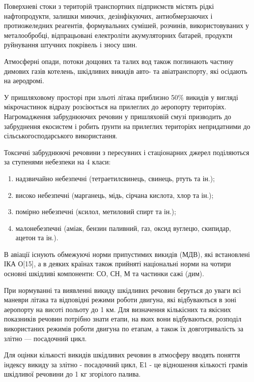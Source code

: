 Поверхневі стоки з територій транспортних підприємств містять рідкі нафтопродукти, залишки миючих, 
дезінфікуючих, антиобмерзаючих і протиожеледних реагентів, формувальних сумішей, розчинів, 
використовуваних у металообробці, відпрацьовані електроліти акумуляторних батарей, продукти 
руйнування штучних покрівель і зносу шин. 

Атмосферні опади, потоки дощових та талих вод також поглинають частину димових газів котелень, 
шкідливих викидів авто- та авіатранспорту, які осідають на аеродромі. 

У пришляховому просторі при зльоті літака приблизно 50\% викидів у вигляді мікрочастинок відразу 
розсіюється на прилеглих до аеропорту територіях. Нагромадження забруднюючих речовин у пришляховій 
смузі призводить до забруднення екосистем і робить ґрунти на прилеглих територіях непридатними до 
сільськогосподарського використання. 

Токсичні забруднюючі речовини з пересувних і стаціонарних джерел поділяються за ступенями небезпеки на 4 класи: 
\begin{enumerate}
 \item надзвичайно небезпечні (тетраетилсвинець, свинець, ртуть та ін.); 
 \item високо небезпечні (марганець, мідь, сірчана кислота, хлор та ін.); 
 \item помірно небезпечні (ксилол, метиловий спирт та ін.); 
 \item малонебезпечні (аміак, бензин паливний, газ, оксид вуглецю, скипидар, ацетон та ін.).
\end{enumerate}


В авіації існують обмежуючі норми припустимих викидів (МДВ), які встановлені ІКА О[15], а в деяких 
країнах також прийняті національні норми на чотири основні шкідливі компоненти: СО, СН, М та частинки сажі (дим).

При нормуванні та виявленні викиду шкідливих речовин беруться до уваги всі маневри літака та 
відповідні режими роботи двигуна, які відбуваються в зоні аеропорту на висоті польоту до 1 км. 
Для визначення кількісних та якісних показників речовин потрібно знати етапи, на яких вони 
відбуваються, розподіл використаних режимів роботи двигуна по етапам, а також їх довготривалість 
за злітно — посадочний цикл.

Для оцінки кількості викидів шкідливих речовин в атмосферу вводять поняття індексу викиду за злітно - 
посадочний цикл, Е1 - це відношення кількості грамів шкідливої речовини до 1 кг згорілого палива.

